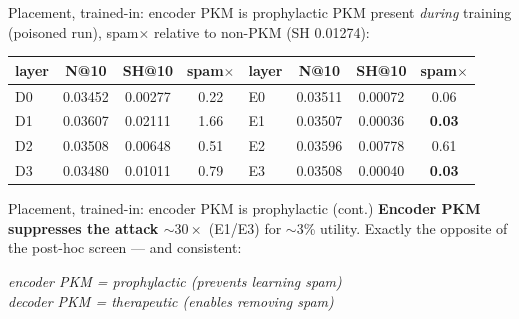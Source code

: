 \documentclass{beamer}
\newcommand{\pierre}[1]{\textcolor{cyan}{#1}}
\begin{document}
\begin{frame}{Placement, trained-in: encoder PKM is prophylactic}
PKM present \emph{during} training (poisoned run), spam$\times$ relative to
non-PKM (SH 0.01274):
\begin{center}
\small
\begin{tabular}{|l|c|c|c||l|c|c|c|}
\hline
layer & N@10 & SH@10 & spam$\times$ & layer & N@10 & SH@10 & spam$\times$ \\
\hline
D0 & 0.03452 & 0.00277 & 0.22 & E0 & 0.03511 & 0.00072 & 0.06 \\
D1 & 0.03607 & 0.02111 & \alert{1.66} & E1 & 0.03507 & 0.00036 & \textbf{0.03} \\
D2 & 0.03508 & 0.00648 & 0.51 & E2 & 0.03596 & 0.00778 & 0.61 \\
D3 & 0.03480 & 0.01011 & 0.79 & E3 & 0.03508 & 0.00040 & \textbf{0.03} \\
\hline
\end{tabular}
\end{center}

\end{frame}

\begin{frame}{Placement, trained-in: encoder PKM is prophylactic (cont.)}
\textbf{Encoder PKM suppresses the attack $\sim 30\times$} (E1/E3) for $\sim$3\%
utility. Exactly the opposite of the post-hoc screen --- and consistent:

\begin{center}
\emph{encoder PKM = prophylactic (prevents learning spam)}\\
\emph{decoder PKM = therapeutic (enables removing spam)}
\end{center}

\end{frame}
\end{document}
